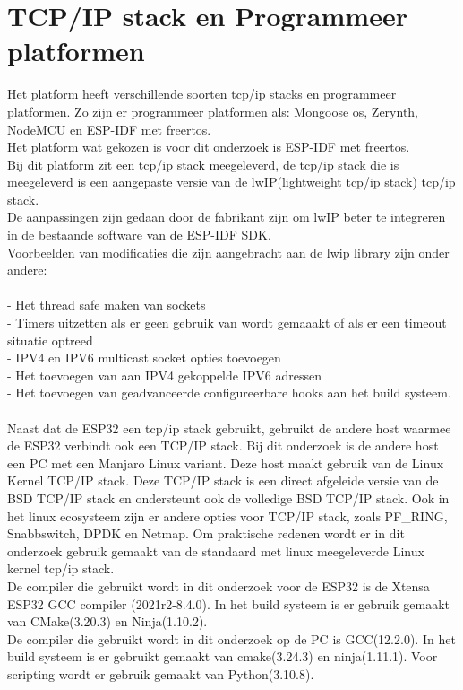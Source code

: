 \documentclass[../DCM2_Verslag.tex]{subfiles}
\begin{document}
\section{TCP/IP stack en Programmeer platformen}
Het platform heeft verschillende soorten tcp/ip stacks en programmeer platformen. Zo zijn er programmeer platformen als: Mongoose os, Zerynth, NodeMCU en ESP-IDF met freertos.\\ Het platform wat gekozen is voor dit onderzoek is ESP-IDF met freertos. 
\\Bij dit platform zit een tcp/ip stack meegeleverd, de tcp/ip stack die is meegeleverd is een aangepaste versie van de lwIP(lightweight tcp/ip stack) tcp/ip stack. 
\\De aanpassingen zijn gedaan door de fabrikant zijn om lwIP beter te integreren in de bestaande software van de ESP-IDF SDK. 
\\Voorbeelden van modificaties die zijn aangebracht aan de lwip library zijn onder andere: \\\\
- Het thread safe maken van sockets\\
- Timers uitzetten als er geen gebruik van wordt gemaaakt of als er een timeout situatie optreed\\
- IPV4 en IPV6 multicast socket opties toevoegen\\
- Het toevoegen van aan IPV4 gekoppelde IPV6 adressen\\
- Het toevoegen van geadvanceerde configureerbare hooks aan het build systeem.\\\\
Naast dat de ESP32 een tcp/ip stack gebruikt, gebruikt de andere host waarmee de ESP32 verbindt ook een TCP/IP stack. Bij dit onderzoek is de andere host een PC met een Manjaro Linux variant. Deze host maakt gebruik van de Linux Kernel TCP/IP stack. Deze TCP/IP stack is een direct afgeleide versie van de BSD TCP/IP stack en ondersteunt ook de volledige BSD TCP/IP stack. Ook in het linux ecosysteem zijn er andere opties voor TCP/IP stack, zoals PF_RING, Snabbswitch, DPDK en Netmap. Om praktische redenen wordt er in dit onderzoek gebruik gemaakt van de standaard met linux meegeleverde Linux kernel tcp/ip stack. \\
De compiler die gebruikt wordt in dit onderzoek voor de ESP32 is de Xtensa ESP32 GCC compiler (2021r2-8.4.0). In het build systeem is er gebruik gemaakt van CMake(3.20.3) en Ninja(1.10.2).\\
De compiler die gebruikt wordt in dit onderzoek op de PC is GCC(12.2.0). In het build systeem is er gebruikt gemaakt van cmake(3.24.3) en ninja(1.11.1). Voor scripting wordt er gebruik gemaakt van Python(3.10.8).
\end{document}
